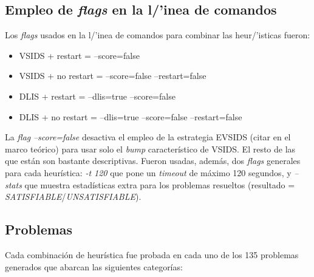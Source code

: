 \subsection{Empleo de \textit{flags} en la l/'inea de comandos}
Los \textit{flags} usados en la l/'inea de comandos para combinar las heur/'isticas fueron:
\begin{itemize}
    \item VSIDS + restart = --score=false
    \item VSIDS + no restart = --score=false --restart=false
    \item DLIS + restart = --dlis=true --score=false
    \item DLIS + no restart = --dlis=true --score=false --restart=false
\end{itemize}

La \textit{flag} \textit{--score=false} desactiva el empleo de la estrategia EVSIDS (citar en el marco te\'orico) para usar solo el \textit{bump} caracter\'istico de VSIDS. El resto de las que est\'an son bastante descriptivas. 
Fueron usadas, adem\'as, dos \textit{flags} generales para cada heur\'istica: \textit{-t 120} que pone un \textit{timeout} de m\'aximo 120 segundos, y \textit{--stats} que muestra estad\'isticas extra para los problemas resueltos (resultado = \textit{SATISFIABLE}/\textit{UNSATISFIABLE}).

\subsection{Problemas}
Cada combinaci\'on de heur\'istica fue probada en cada uno de los 135 problemas generados que abarcan las siguientes categor\'ias:

